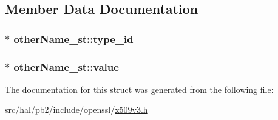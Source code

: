\subsection{Member Data Documentation}
\subsubsection[{\texorpdfstring{type\+\_\+id}{type_id}}]{$\ast$ other\+Name\+\_\+st\+::type\+\_\+id}\hypertarget{structother_name__st_a6a75851c46b8796a1f986ef545d423a6}{}\label{structother_name__st_a6a75851c46b8796a1f986ef545d423a6}
\subsubsection[{\texorpdfstring{value}{value}}]{$\ast$ other\+Name\+\_\+st\+::value}\hypertarget{structother_name__st_a490a0f0d33dd8e1b7a2283b6da0951d5}{}\label{structother_name__st_a490a0f0d33dd8e1b7a2283b6da0951d5}


The documentation for this struct was generated from the following file\+:\begin{DoxyCompactItemize}
\item 
src/hal/pb2/include/openssl/\hyperlink{x509v3_8h}{x509v3.\+h}\end{DoxyCompactItemize}
